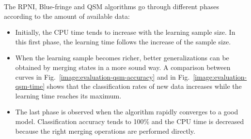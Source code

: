 The RPNI, Blue-fringe and QSM algorithms go through different phases according to the amount of available data:
\begin{itemize} 
\item Initially, the CPU time tends to increase with the learning sample size. In this first phase, the learning time follows the increase of the sample size. 
\item When the learning sample becomes richer, better generalizations can be obtained by merging states in a more sound way. A comparison between curves in Fig.~\ref{image:evaluation-qsm-accuracy} and in Fig.~\ref{image:evaluation-qsm-time} shows that the classification rates of new data increases while the learning time reaches its maximum. 
\item The last phase is observed when the algorithm rapidly converges to a good model. Classification accuracy tends to 100\% and the CPU time is decreased because the right merging operations are performed directly. 
\end{itemize}

